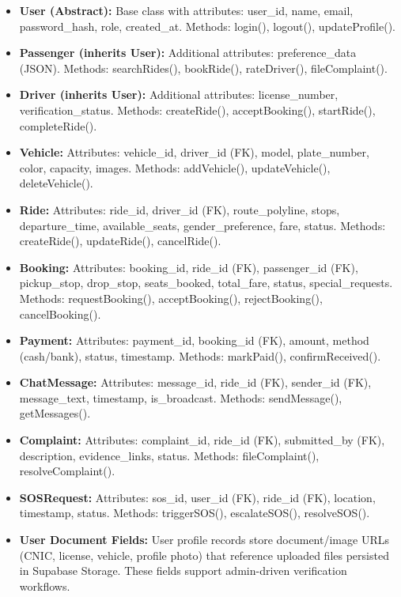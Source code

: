 \begin{itemize}
    \item \textbf{User (Abstract):} Base class with attributes: user\_id, name, email, password\_hash, role, created\_at. Methods: login(), logout(), updateProfile().
    
    \item \textbf{Passenger (inherits User):} Additional attributes: preference\_data (JSON). Methods: searchRides(), bookRide(), rateDriver(), fileComplaint().
    
    \item \textbf{Driver (inherits User):} Additional attributes: license\_number, verification\_status. Methods: createRide(), acceptBooking(), startRide(), completeRide().
    
    \item \textbf{Vehicle:} Attributes: vehicle\_id, driver\_id (FK), model, plate\_number, color, capacity, images. Methods: addVehicle(), updateVehicle(), deleteVehicle().
    
    \item \textbf{Ride:} Attributes: ride\_id, driver\_id (FK), route\_polyline, stops, departure\_time, available\_seats, gender\_preference, fare, status. Methods: createRide(), updateRide(), cancelRide().
    
    \item \textbf{Booking:} Attributes: booking\_id, ride\_id (FK), passenger\_id (FK), pickup\_stop, drop\_stop, seats\_booked, total\_fare, status, special\_requests. Methods: requestBooking(), acceptBooking(), rejectBooking(), cancelBooking().
    
    \item \textbf{Payment:} Attributes: payment\_id, booking\_id (FK), amount, method (cash/bank), status, timestamp. Methods: markPaid(), confirmReceived().
    
    \item \textbf{ChatMessage:} Attributes: message\_id, ride\_id (FK), sender\_id (FK), message\_text, timestamp, is\_broadcast. Methods: sendMessage(), getMessages().
    
    \item \textbf{Complaint:} Attributes: complaint\_id, ride\_id (FK), submitted\_by (FK), description, evidence\_links, status. Methods: fileComplaint(), resolveComplaint().
    
    \item \textbf{SOSRequest:} Attributes: sos\_id, user\_id (FK), ride\_id (FK), location, timestamp, status. Methods: triggerSOS(), escalateSOS(), resolveSOS().
    
    \item \textbf{User Document Fields:} User profile records store document/image URLs (CNIC, license, vehicle, profile photo) that reference uploaded files persisted in Supabase Storage. These fields support admin-driven verification workflows.
\end{itemize}


